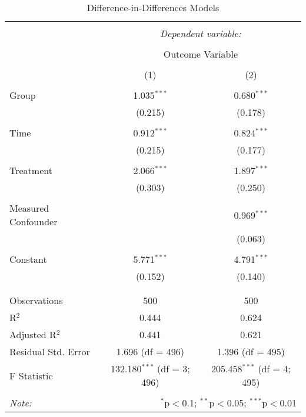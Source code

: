 
\begin{table}[!htbp] \centering 
  \caption{Difference-in-Differences Models} 
  \label{} 
\begin{tabular}{@{\extracolsep{5pt}}lcc} 
\\[-1.8ex]\hline 
\hline \\[-1.8ex] 
 & \multicolumn{2}{c}{\textit{Dependent variable:}} \\ 
\cline{2-3} 
\\[-1.8ex] & \multicolumn{2}{c}{Outcome Variable} \\ 
\\[-1.8ex] & (1) & (2)\\ 
\hline \\[-1.8ex] 
 Group & 1.035$^{***}$ & 0.680$^{***}$ \\ 
  & (0.215) & (0.178) \\ 
  & & \\ 
 Time & 0.912$^{***}$ & 0.824$^{***}$ \\ 
  & (0.215) & (0.177) \\ 
  & & \\ 
 Treatment & 2.066$^{***}$ & 1.897$^{***}$ \\ 
  & (0.303) & (0.250) \\ 
  & & \\ 
 Measured Confounder &  & 0.969$^{***}$ \\ 
  &  & (0.063) \\ 
  & & \\ 
 Constant & 5.771$^{***}$ & 4.791$^{***}$ \\ 
  & (0.152) & (0.140) \\ 
  & & \\ 
\hline \\[-1.8ex] 
Observations & 500 & 500 \\ 
R$^{2}$ & 0.444 & 0.624 \\ 
Adjusted R$^{2}$ & 0.441 & 0.621 \\ 
Residual Std. Error & 1.696 (df = 496) & 1.396 (df = 495) \\ 
F Statistic & 132.180$^{***}$ (df = 3; 496) & 205.458$^{***}$ (df = 4; 495) \\ 
\hline 
\hline \\[-1.8ex] 
\textit{Note:}  & \multicolumn{2}{r}{$^{*}$p$<$0.1; $^{**}$p$<$0.05; $^{***}$p$<$0.01} \\ 
\end{tabular} 
\end{table} 
